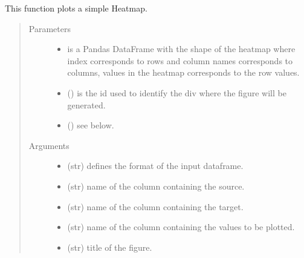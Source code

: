 \documentclass[letterpaper,10pt,english]{sphinxmanual}
\begin{document}
\begin{fulllineitems}
\label{\detokenize{_autosummary/analytics_core.viz:analytics_core.viz.viz.get_heatmapplot}}
This function plots a simple Heatmap.
\begin{quote}\begin{description}
\item[{Parameters}] \leavevmode\begin{itemize}
\item {} 
 \textendash{} is a Pandas DataFrame with the shape of the heatmap where index corresponds to rows                 and column names corresponds to columns, values in the heatmap corresponds to the row values.

\item {} 
 () \textendash{} is the id used to identify the div where the figure will be generated.

\item {} 
 () \textendash{} see below.

\end{itemize}

\item[{Arguments}] \leavevmode\begin{itemize}
\item {} 
 (str) \textendash{} defines the format of the input dataframe.

\item {} 
 (str) \textendash{} name of the column containing the source.

\item {} 
 (str) \textendash{} name of the column containing the target.

\item {} 
 (str) \textendash{} name of the column containing the values to be plotted.

\item {} 
 (str) \textendash{} title of the figure.


\end{itemize}
\end{description}
\end{quote}
\end{fulllineitems}
\end{document}
